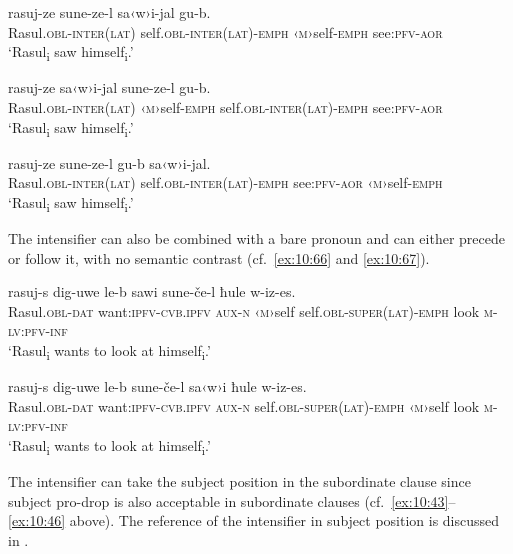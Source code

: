 ﻿\documentclass[output=paper]{langsci/langscibook}
\begin{document}
\ea \label{ex:10:63} %
\gll  rasuj-ze sune-ze-l sa‹w›i-jal gu-b.\\
Rasul.\textsc{obl}-\textsc{inter}(\textsc{lat}) self.\textsc{obl}-\textsc{inter}(\textsc{lat})-\textsc{emph} ‹\textsc{m}›self-\textsc{emph} see:\textsc{pfv}-\textsc{aor} \\ 
\glt `Rasul\textsubscript{i} saw himself\textsubscript{i}.'

\ex \label{ex:10:64} %
\gll  rasuj-ze sa‹w›i-jal sune-ze-l gu-b.\\
Rasul.\textsc{obl}-\textsc{inter}(\textsc{lat}) ‹\textsc{m}›self-\textsc{emph} self.\textsc{obl}-\textsc{inter}(\textsc{lat})-\textsc{emph} see:\textsc{pfv}-\textsc{aor}\\ 
\glt `Rasul\textsubscript{i} saw himself\textsubscript{i}.'

\ex \label{ex:10:65} %
\gll  *rasuj-ze sune-ze-l gu-b sa‹w›i-jal.\\
Rasul.\textsc{obl}-\textsc{inter}(\textsc{lat}) self.\textsc{obl}-\textsc{inter}(\textsc{lat})-\textsc{emph}   see:\textsc{pfv}-\textsc{aor} ‹\textsc{m}›self-\textsc{emph}\\
\glt `Rasul\textsubscript{i} saw   himself\textsubscript{i}.'
\z

The intensifier can also be combined with a bare pronoun and can either
precede or follow it, with no semantic contrast (cf.\ \ref{ex:10:66} and \ref{ex:10:67}).

\ea \label{ex:10:66} %
\gll  rasuj-s dig-uwe le-b sawi sune-če-l ħule w-iz-es.\\
Rasul.\textsc{obl}-\textsc{dat} want:\textsc{ipfv}-\textsc{cvb.ipfv} \textsc{aux}-\textsc{n} ‹\textsc{m}›self self.\textsc{obl}-\textsc{super}(\textsc{lat})-\textsc{emph} look \textsc{m}-\textsc{lv}:\textsc{pfv}-\textsc{inf}\\
\glt `Rasul\textsubscript{i} wants to look at himself\textsubscript{i}.'

\ex \label{ex:10:67} %
\gll  rasuj-s dig-uwe le-b sune-če-l sa‹w›i ħule w-iz-es.\\
Rasul.\textsc{obl}-\textsc{dat} want:\textsc{ipfv}-\textsc{cvb.ipfv} \textsc{aux}-\textsc{n} self.\textsc{obl}-\textsc{super}(\textsc{lat})-\textsc{emph} ‹\textsc{m}›self look \textsc{m}-\textsc{lv}:\textsc{pfv}-\textsc{inf}\\
\glt `Rasul\textsubscript{i} wants to look at
himself\textsubscript{i}.'
\z

The intensifier can take the subject position in the subordinate clause
since subject pro-drop is also acceptable in subordinate clauses (cf.\
\ref{ex:10:43}–\ref{ex:10:46} above). The reference of the intensifier in subject
position is discussed in \sectref{non-subject-orientedness}.
\end{document}
